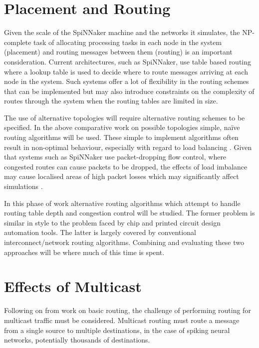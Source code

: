 	\section{Placement and Routing}
		
		Given the scale of the SpiNNaker machine and the networks it simulates, the
		NP-complete task of allocating processing tasks in each node in the system
		(placement) and routing messages between them (routing) is an important
		consideration. Current architectures, such as SpiNNaker, use table based
		routing where a lookup table is used to decide where to route messages
		arriving at each node in the system. Such systems offer a lot of flexibility
		in the routing schemes that can be implemented but may also introduce
		constraints on the complexity of routes through the system when the routing
		tables are limited in size.
		
		The use of alternative topologies will require alternative routing schemes
		to be specified. In the above comparative work on possible topologies
		simple, na\"ive routing algorithms will be used. These simple to implement
		algorithms often result in non-optimal behaviour, especially with regard to
		load balancing \cite{dally04}. Given that systems such as SpiNNaker use
		packet-dropping flow control, where congested routes can cause packets to be
		dropped, the effects of load imbalance may cause localised areas of high
		packet losses which may significantly affect simulations
		\cite{greenfield10}.
		
		In this phase of work alternative routing algorithms which attempt to handle
		routing table depth and congestion control will be studied. The former
		problem is similar in style to the problem faced by chip and printed circuit
		design automation tools. The latter is largely covered by conventional
		interconnect/network routing algorithms. Combining and evaluating these two
		approaches will be where much of this time is spent.
	
	\section{Effects of Multicast}
		
		Following on from work on basic routing, the challenge of performing routing
		for multicast traffic must be considered. Multicast routing must route a
		message from a single source to multiple destinations, in the case of
		spiking neural networks, potentially thousands of destinations.
		

